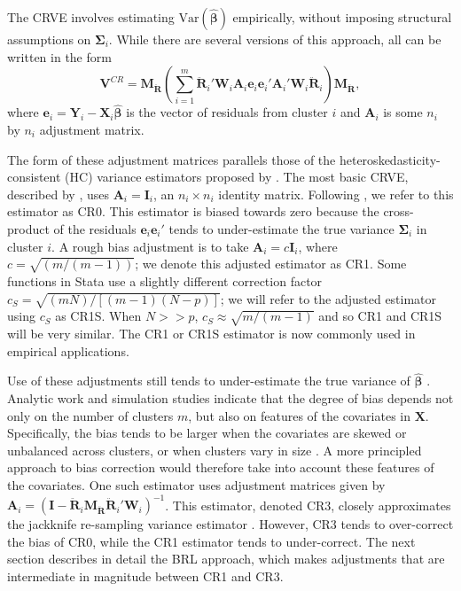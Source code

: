 \documentclass[12pt]{article}\usepackage[]{graphicx}\usepackage[]{color}
\newcommand{\Var}{\text{Var}}
\newcommand{\bm}{\mathbf}
\newcommand{\bs}{\boldsymbol}
\begin{document}
The CRVE involves estimating $\Var\left(\bs{\hat\beta}\right)$ empirically, without imposing structural assumptions on $\bs\Sigma_i$. 
While there are several versions of this approach, all can be written in the form
\begin{equation}
\label{eq:V_small}
\bm{V}^{CR} = \bm{M_{\ddot{R}}}\left(\sum_{i=1}^m \bm{\ddot{R}}_i'\bm{W}_i \bm{A}_i \bm{e}_i \bm{e}_i' \bm{A}_i' \bm{W}_i \bm{\ddot{R}}_i\right) \bm{M_{\ddot{R}}},
\end{equation}
where $\bm{e}_i = \bm{Y}_i - \bm{X}_i \bs{\hat\beta}$ is the vector of residuals from cluster $i$ and $\bm{A}_i$ is some $n_i$ by $n_i$ adjustment matrix. 

The form of these adjustment matrices parallels those of the heteroskedasticity-consistent (HC) variance estimators proposed by \citet*{MacKinnon1985some}. 
The most basic CRVE, described by \citet{Liang1986longitudinal}, uses $\bm{A}_i = \bm{I}_i$, an $n_i \times n_i$ identity matrix. 
Following \citet{Cameron2015practitioners}, we refer to this estimator as CR0. 
This estimator is biased towards zero because the cross-product of the residuals $\bm{e}_i \bm{e}_i'$ tends to under-estimate the true variance $\bs\Sigma_i$ in cluster $i$.
A rough bias adjustment is to take $\bm{A}_i = c\bm{I}_i$, where $c = \sqrt{(m/(m-1))}$; we denote this adjusted estimator as CR1. Some functions in Stata use a slightly different correction factor $c_S = \sqrt{(m N)/[(m - 1)(N - p)]}$; we will refer to the adjusted estimator using $c_S$ as CR1S. When $N >> p$, $c_S \approx \sqrt{m/(m-1)}$ and so CR1 and CR1S will be very similar.
The CR1 or CR1S estimator is now commonly used in empirical applications.

Use of these adjustments still tends to under-estimate the true variance of $\hat{\bs\beta}$ \citep{Cameron2015practitioners}. 
Analytic work and simulation studies indicate that the degree of bias depends not only on the number of clusters $m$, but also on features of the covariates in $\bm{X}$. Specifically, 
the bias tends to be larger when the covariates are skewed or unbalanced across clusters, or when clusters vary in size \citep{Carter2013asymptotic, MacKinnon2013thirty}. 
A more principled approach to bias correction would therefore take into account these features of the covariates. 
One such estimator uses adjustment matrices given by $\bm{A}_i = \left(\bm{I} - \bm{\ddot{R}}_i \bm{M_{\ddot{R}}}\bm{\ddot{R}}_i'\bm{W}_i\right)^{-1}$. This estimator, denoted CR3, closely approximates the jackknife re-sampling variance estimator \citep{Bell2002bias, Mancl2001covariance}.  
However, CR3 tends to over-correct the bias of CR0, while the CR1 estimator tends to under-correct. 
The next section describes in detail the BRL approach, which makes adjustments that are intermediate in magnitude between CR1 and CR3. 
\end{document}
